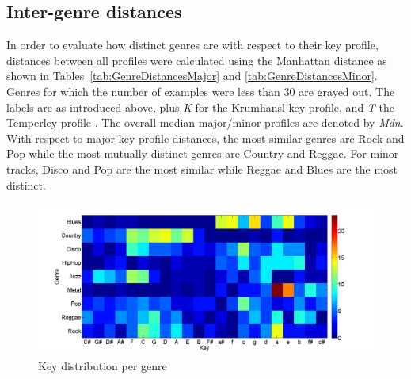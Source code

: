 \documentclass{article}
\begin{document}
\subsection{Inter-genre distances}
In order to evaluate how distinct genres are with respect to their key profile, distances between all profiles were calculated using the Manhattan distance as shown in Tables~\ref{tab:GenreDistancesMajor} and \ref{tab:GenreDistancesMinor}. Genres for which the number of examples were less than 30 are grayed out. The labels are as introduced above, plus \textit{K} for the Krumhansl key profile,  and \textit{T} the Temperley profile \cite{temperley_tonal_2007}. The overall median major/minor profiles are denoted by \textit{Mdn}.
With respect to major key profile distances, the most similar genres are Rock and Pop while the most mutually distinct genres are Country and Reggae. For minor tracks, Disco and Pop are the most similar while Reggae and Blues are the most distinct.




\begin{figure}
    \includegraphics[scale=.2]{graph/key_distribution_colour_legend}
	\caption{Key distribution per genre}
	\label{fig:KeyDistributionPerGenre}
\end{figure}
\end{document}
